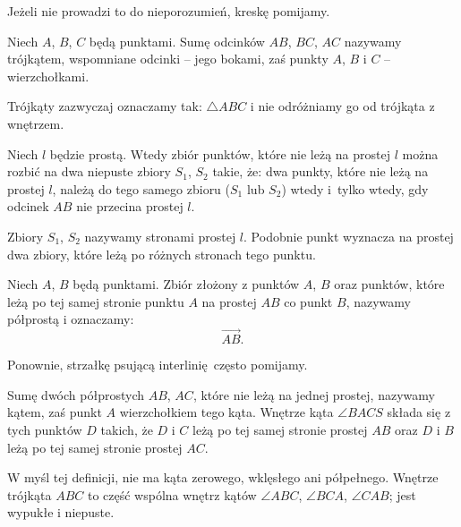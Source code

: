 Jeżeli nie prowadzi to do nieporozumień, kreskę pomijamy.

\begin{definition}[trójkąt]
    Niech $A$, $B$, $C$ będą punktami.
    Sumę odcinków $AB$, $BC$, $AC$ nazywamy trójkątem, wspomniane odcinki -- jego bokami, zaś punkty $A$, $B$ i $C$ -- wierzchołkami.
%
\end{definition} %

Trójkąty zazwyczaj oznaczamy tak: $\triangle ABC$ i nie odróżniamy go od trójkąta z wnętrzem.

\begin{proposition}
    Niech $l$ będzie prostą.
    Wtedy zbiór punktów, które nie leżą na prostej $l$ można rozbić na dwa niepuste zbiory $S_1$, $S_2$ takie, że: dwa punkty, które nie leżą na prostej $l$, należą do tego samego zbioru ($S_1$ lub $S_2$) wtedy i~tylko wtedy, gdy odcinek $AB$ nie przecina prostej $l$.
\end{proposition} %

Zbiory $S_1$, $S_2$ nazywamy stronami prostej $l$.
%
Podobnie punkt wyznacza na prostej dwa zbiory, które leżą po różnych stronach tego punktu.

\begin{definition}[półprosta]
    Niech $A$, $B$ będą punktami.
    Zbiór złożony z punktów $A$, $B$ oraz punktów, które leżą po tej samej stronie punktu $A$ na prostej $AB$ co punkt $B$, nazywamy półprostą i oznaczamy:
%
    \begin{equation}
        \overrightarrow{AB}.
    \end{equation}
\end{definition} %

Ponownie, strzałkę psującą interlinię często pomijamy.

\begin{definition}[kąt]
    Sumę dwóch półprostych $AB$, $AC$, które nie leżą na jednej prostej, nazywamy kątem, zaś punkt $A$ wierzchołkiem tego kąta.
    Wnętrze kąta $\angle BACS$ składa się z tych punktów $D$ takich, że $D$ i $C$ leżą po tej samej stronie prostej $AB$ oraz $D$ i $B$ leżą po tej samej stronie prostej $AC$. 
\end{definition} %

W myśl tej definicji, nie ma kąta zerowego, wklęsłego ani półpełnego.
%
%
%
Wnętrze trójkąta $ABC$ to część wspólna wnętrz kątów $\angle ABC$, $\angle BCA$, $\angle CAB$; jest wypukłe i niepuste.

%